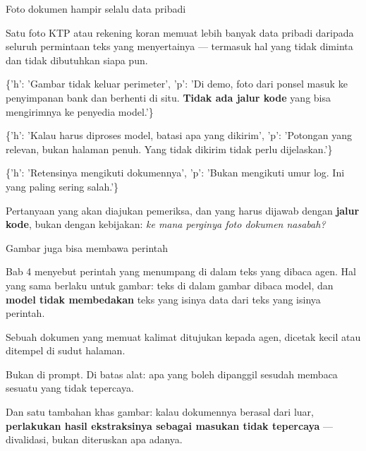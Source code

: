 \documentclass[aspectratio=169,11pt,t]{beamer}
\begin{document}
\begin{frame}[shrink=25]{Foto dokumen hampir selalu data pribadi}
{\fontsize{9.4}{12.6}\selectfont\color{fg2}Satu foto KTP atau rekening koran memuat lebih banyak data pribadi daripada seluruh permintaan teks yang menyertainya --- termasuk hal yang tidak diminta dan tidak dibutuhkan siapa pun.\par}\vskip 4pt
\begin{isteps}
\item \{'h': 'Gambar tidak keluar perimeter', 'p': 'Di demo, foto dari ponsel masuk ke penyimpanan bank dan berhenti di situ. \textbf{Tidak ada jalur kode} yang bisa mengirimnya ke penyedia model.'\}
\item \{'h': 'Kalau harus diproses model, batasi apa yang dikirim', 'p': 'Potongan yang relevan, bukan halaman penuh. Yang tidak dikirim tidak perlu dijelaskan.'\}
\item \{'h': 'Retensinya mengikuti dokumennya', 'p': 'Bukan mengikuti umur log. Ini yang paling sering salah.'\}
\end{isteps}
\begin{iband}[signal]
Pertanyaan yang akan diajukan pemeriksa, dan yang harus dijawab dengan \textbf{jalur kode}, bukan dengan kebijakan: \textit{ke mana perginya foto dokumen nasabah?}
\end{iband}
\end{frame}

\begin{frame}[shrink=25]{Gambar juga bisa membawa perintah}
{\fontsize{9.4}{12.6}\selectfont\color{fg2}Bab 4 menyebut perintah yang menumpang di dalam teks yang dibaca agen. Hal yang sama berlaku untuk gambar: teks di dalam gambar dibaca model, dan \textbf{model tidak membedakan} teks yang isinya data dari teks yang isinya perintah.\par}\vskip 4pt
\begin{minipage}[t]{0.494\textwidth}
\begin{icard}
Sebuah dokumen yang memuat kalimat ditujukan kepada agen, dicetak kecil atau ditempel di sudut halaman.
\end{icard}
\end{minipage}%
\hfill
\begin{minipage}[t]{0.494\textwidth}
\begin{icardaccent}
Bukan di prompt. Di batas alat: apa yang boleh dipanggil sesudah membaca sesuatu yang tidak tepercaya.
\end{icardaccent}
\end{minipage}%
\begin{iband}[signal]
Dan satu tambahan khas gambar: kalau dokumennya berasal dari luar, \textbf{perlakukan hasil ekstraksinya sebagai masukan tidak tepercaya} --- divalidasi, bukan diteruskan apa adanya.
\end{iband}
\end{frame}
\end{document}
